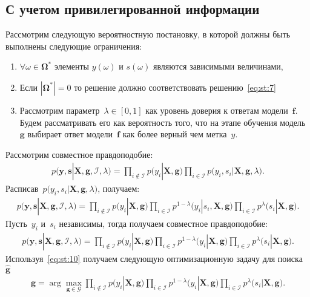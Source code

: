\documentclass[12pt, twoside]{article}
\numberwithin{equation}{section}
\begin{document}
\subsection{С учетом привилегированной информации}
Рассмотрим следующую вероятностную постановку, в которой должны быть выполнены следующие ограничения:
\begin{enumerate}
	\item $\forall \omega \in \bm{\Omega}^*$ элементы $y(\omega)$ и $s(\omega)$ являются зависимыми величинами,
	\item Если $|\bm{\Omega}^*|=0$ то решение должно соответствовать решению~\eqref{eq:st:7}
	\item Рассмотрим параметр~$\lambda\in[0,1]$ как уровень доверия к ответам модели~$\mathbf{f}$. Будем рассматривать его как вероятность того, что на этапе обучения модель~$\mathbf{g}$ выбирает ответ модели~$\mathbf{f}$ как более верный чем метка~$y$.
\end{enumerate}

Рассмотрим совместное правдоподобие:
\[
\label{eq:st:8}
\begin{aligned}
p\bigr(\textbf{y}, \textbf{s}|\textbf{X}, \textbf{g}, \mathcal{I}, \lambda\bigr)=\prod_{i\not\in \mathcal{I}}p\bigr(y_i|\textbf{X}, \textbf{g}\bigr)\prod_{i\in \mathcal{I}}p\bigr(y_i, s_i|\textbf{X}, \textbf{g}, \lambda\bigr).
\end{aligned}
\]
Расписав~$p\bigr(y_i, s_i|\textbf{X}, \textbf{g}, \lambda\bigr)$, получаем:
\[
\label{eq:st:9}
\begin{aligned}
p\bigr(\textbf{y}, \textbf{s}|\textbf{X}, \textbf{g}, \mathcal{I}, \lambda\bigr)=\prod_{i\not\in \mathcal{I}}p\bigr(y_i|\textbf{X}, \textbf{g}\bigr)\prod_{i\in \mathcal{I}}p^{1-\lambda}\bigr(y_i|s_i, \textbf{X}, \textbf{g}\bigr)\prod_{i\in \mathcal{I}}p^{\lambda}\bigr(s_i|\textbf{X}, \textbf{g}\bigr).
\end{aligned}
\]
Пусть~$y_i$ и~$s_i$ независимы, тогда получаем совместное правдоподобие:
\[
\label{eq:st:10}
\begin{aligned}
p\bigr(\textbf{y}, \textbf{s}|\textbf{X}, \textbf{g}, \mathcal{I}, \lambda\bigr)=\prod_{i\not\in \mathcal{I}}p\bigr(y_i|\textbf{X}, \textbf{g}\bigr)\prod_{i\in \mathcal{I}}p^{1-\lambda}\bigr(y_i|\textbf{X}, \textbf{g}\bigr)\prod_{i\in \mathcal{I}}p^{\lambda}\bigr(s_i|\textbf{X}, \textbf{g}\bigr).
\end{aligned}
\]
Используя~\eqref{eq:st:10} получаем следующую оптимизационную задачу для поиска~$\hat{\textbf{g}}$
\[
\label{eq:st:11}
\begin{aligned}
\hat{\textbf{g}} = \arg\max_{\textbf{g}\in \mathcal{G}} \prod_{i\not\in \mathcal{I}}p\bigr(y_i|\textbf{X}, \textbf{g}\bigr)\prod_{i\in \mathcal{I}}p^{1-\lambda}\bigr(y_i|\textbf{X}, \textbf{g}\bigr)\prod_{i\in \mathcal{I}}p^{\lambda}\bigr(s_i|\textbf{X}, \textbf{g}\bigr).
\end{aligned}
\]
\end{document}
